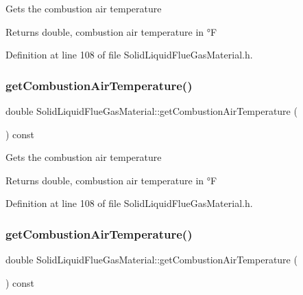 Gets the combustion air temperature \begin{DoxyReturn}{Returns}
double, combustion air temperature in °F 
\end{DoxyReturn}


Definition at line 108 of file Solid\+Liquid\+Flue\+Gas\+Material.\+h.

\mbox{\label{class_solid_liquid_flue_gas_material_a8757b831e5a2ef26dbb0cf271c0e8207}} 
\subsubsection{\texorpdfstring{get\+Combustion\+Air\+Temperature()}{getCombustionAirTemperature()}\hspace{0.1cm}{\footnotesize\ttfamily [2/3]}}
{\footnotesize\ttfamily double Solid\+Liquid\+Flue\+Gas\+Material\+::get\+Combustion\+Air\+Temperature (\begin{DoxyParamCaption}{ }\end{DoxyParamCaption}) const\hspace{0.3cm}{\ttfamily [inline]}}

Gets the combustion air temperature \begin{DoxyReturn}{Returns}
double, combustion air temperature in °F 
\end{DoxyReturn}


Definition at line 108 of file Solid\+Liquid\+Flue\+Gas\+Material.\+h.

\mbox{\label{class_solid_liquid_flue_gas_material_a8757b831e5a2ef26dbb0cf271c0e8207}} 
\subsubsection{\texorpdfstring{get\+Combustion\+Air\+Temperature()}{getCombustionAirTemperature()}\hspace{0.1cm}{\footnotesize\ttfamily [3/3]}}
{\footnotesize\ttfamily double Solid\+Liquid\+Flue\+Gas\+Material\+::get\+Combustion\+Air\+Temperature (\begin{DoxyParamCaption}{ }\end{DoxyParamCaption}) const\hspace{0.3cm}{\ttfamily [inline]}}

